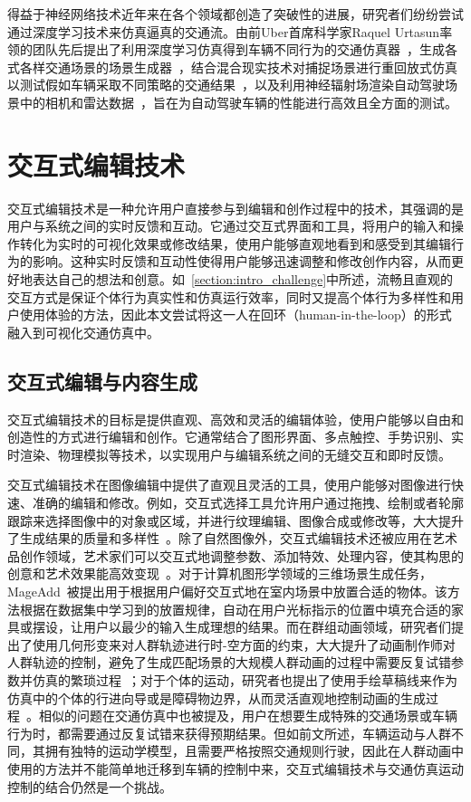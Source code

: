 得益于神经网络技术近年来在各个领域都创造了突破性的进展，研究者们纷纷尝试通过深度学习技术来仿真逼真的交通流。由前Uber首席科学家Raquel Urtasun率领的团队先后提出了利用深度学习仿真得到车辆不同行为的交通仿真器~\cite{suo2021trafficsim}，生成各式各样交通场景的场景生成器~\cite{tan2021scenegen}，结合混合现实技术对捕捉场景进行重回放式仿真以测试假如车辆采取不同策略的交通结果~\cite{suo2023mixsim}，以及利用神经辐射场渲染自动驾驶场景中的相机和雷达数据~\cite{yang2023unisim}，旨在为自动驾驶车辆的性能进行高效且全方面的测试。



\section{交互式编辑技术}

交互式编辑技术是一种允许用户直接参与到编辑和创作过程中的技术，其强调的是用户与系统之间的实时反馈和互动。它通过交互式界面和工具，将用户的输入和操作转化为实时的可视化效果或修改结果，使用户能够直观地看到和感受到其编辑行为的影响。这种实时反馈和互动性使得用户能够迅速调整和修改创作内容，从而更好地表达自己的想法和创意。如~\ref{section:intro_challenge}中所述，流畅且直观的交互方式是保证个体行为真实性和仿真运行效率，同时又提高个体行为多样性和用户使用体验的方法，因此本文尝试将这一人在回环（human-in-the-loop）的形式融入到可视化交通仿真中。


\subsection{交互式编辑与内容生成}

交互式编辑技术的目标是提供直观、高效和灵活的编辑体验，使用户能够以自由和创造性的方式进行编辑和创作。它通常结合了图形界面、多点触控、手势识别、实时渲染、物理模拟等技术，以实现用户与编辑系统之间的无缝交互和即时反馈。

交互式编辑技术在图像编辑中提供了直观且灵活的工具，使用户能够对图像进行快速、准确的编辑和修改。例如，交互式选择工具允许用户通过拖拽、绘制或者轮廓跟踪来选择图像中的对象或区域，并进行纹理编辑、图像合成或修改等，大大提升了生成结果的质量和多样性~\cite{ruhl2015interactive, dai2021edit}。除了自然图像外，交互式编辑技术还被应用在艺术品创作领域，艺术家们可以交互式地调整参数、添加特效、处理内容，使其构思的创意和艺术效果能高效变现~\cite{huang2022caripainter}。对于计算机图形学领域的三维场景生成任务，MageAdd~\cite{zhang2021mageadd}被提出用于根据用户偏好交互式地在室内场景中放置合适的物体。该方法根据在数据集中学习到的放置规律，自动在用户光标指示的位置中填充合适的家具或摆设，让用户以最少的输入生成理想的结果。而在群组动画领域，研究者们提出了使用几何形变来对人群轨迹进行时-空方面的约束，大大提升了动画制作师对人群轨迹的控制，避免了生成匹配场景的大规模人群动画的过程中需要反复试错参数并仿真的繁琐过程~\cite{kim2014interactive, zhang2020crowd}；对于个体的运动，研究者也提出了使用手绘草稿线来作为仿真中的个体的行进向导或是障碍物边界，从而灵活直观地控制动画的生成过程~\cite{montana2017sketching}。相似的问题在交通仿真中也被提及，用户在想要生成特殊的交通场景或车辆行为时，都需要通过反复试错来获得预期结果。但如前文所述，车辆运动与人群不同，其拥有独特的运动学模型，且需要严格按照交通规则行驶，因此在人群动画中使用的方法并不能简单地迁移到车辆的控制中来，交互式编辑技术与交通仿真运动控制的结合仍然是一个挑战。


